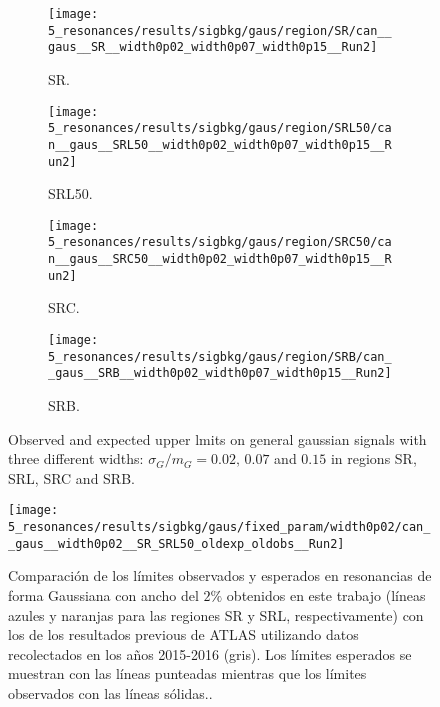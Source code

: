 \begin{figure}[ht!]
    \centering
    \begin{subfigure}[h]{0.49\linewidth}
        \centering
        \texttt{[image: 5\_resonances/results/sigbkg/gaus/region/SR/can\_\_gaus\_\_SR\_\_width0p02\_width0p07\_width0p15\_\_Run2]}
        \caption{SR.}
    \end{subfigure}
    \begin{subfigure}[h]{0.49\linewidth}
        \centering
        \texttt{[image: 5\_resonances/results/sigbkg/gaus/region/SRL50/can\_\_gaus\_\_SRL50\_\_width0p02\_width0p07\_width0p15\_\_Run2]}
        \caption{SRL50.}
    \end{subfigure}
    \begin{subfigure}[h]{0.49\linewidth}
        \centering
        \texttt{[image: 5\_resonances/results/sigbkg/gaus/region/SRC50/can\_\_gaus\_\_SRC50\_\_width0p02\_width0p07\_width0p15\_\_Run2]}
        \caption{SRC.}
    \end{subfigure}
    \begin{subfigure}[h]{0.49\linewidth}
        \centering
        \texttt{[image: 5\_resonances/results/sigbkg/gaus/region/SRB/can\_\_gaus\_\_SRB\_\_width0p02\_width0p07\_width0p15\_\_Run2]}
        \caption{SRB.}
    \end{subfigure}
    \caption{Observed and expected upper lmits on general gaussian signals with three different widths: \(\sigma_G/m_G = 0.02, \, 0.07\) and \(0.15\) in regions SR, SRL, SRC and SRB.}
    \label{fig:results:results:bkgsig:results:gaus:limits}
\end{figure}

\begin{figure}[ht!]
    \centering
    \texttt{[image: 5\_resonances/results/sigbkg/gaus/fixed\_param/width0p02/can\_\_gaus\_\_width0p02\_\_SR\_SRL50\_oldexp\_oldobs\_\_Run2]}
    \caption{Comparación de los límites observados y esperados en resonancias de forma Gaussiana con ancho del \(2\%\) obtenidos en este trabajo (líneas azules y naranjas para las regiones SR y SRL, respectivamente) con los de los resultados previous de \ac{ATLAS} utilizando datos recolectados en los años 2015-2016 (gris). Los límites esperados se muestran con las líneas punteadas mientras que los límites observados con las líneas sólidas..}
    \label{fig:results:results:bkgsig:results:gaus:limits_comparison_old}
\end{figure}


